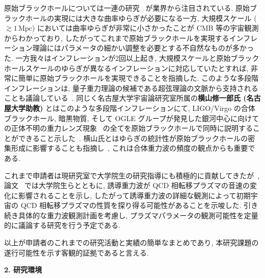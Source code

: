 \documentclass[11pt,a4paper,uplatex,dvipdfmx]{ujarticle} 		%
\newcommand{\研究課題名}{曲率ゆらぎの統計と原始ブラックホール量の精密対応}
\newcommand{\研究機関名}{名古屋大学}
\newcommand{\研究代表者氏名}{多田祐一郎}
\newcommand{\研究期間の最終元号年度}{4}  %
\renewcommand{\emph}[1]{{\sffamily\gtfamily\bfseries #1}}
\begin{document}
原始ブラックホールについては一連の研究~\cite{Kawasaki:2016pql,Inomata:2016rbd,Inomata:2017okj,Inomata:2017uaw} が業界から注目されている.
原始ブラックホールの実現には大きな曲率ゆらぎが必要になる一方, 大規模スケール ($\gtrsim1\,\mathrm{Mpc}$) においては曲率ゆらぎが非常に小さかったことが CMB 等の宇宙観測からわかっており,
したがってこれまで原始ブラックホールを実現するインフレーション理論にはパラメータの細かい調整を必要とする不自然なものが多かった.
一方我々はインフレーションが2回以上起き, 大規模スケールと原始ブラックホールスケールのゆらぎが異なるインフレーションに対応していたとすれば, 非常に簡単に原始ブラックホールを実現できることを指摘した.
このような多段階インフレーションは, 量子重力理論の候補である超弦理論の文脈から支持されることも議論している~\cite{Kogai:2020jkq}.
同じく名古屋大学宇宙論研究室所属の\emph{横山修一郎氏 (名古屋大学助教)} とはこのような多段階インフレーションにて, LIGO/Virgo の合体ブラックホール, 暗黒物質, そして OGLE グループが発見した銀河中心に向けての正体不明の重力レンズ現象~\cite{Niikura:2019kqi}
の全てを原始ブラックホールで同時に説明することができること示した~\cite{Tada:2019amh}.
横山氏とはゆらぎの統計性が原始ブラックホールの密集形成に影響することも指摘し~\cite{Tada:2015noa}, これは合体重力波の頻度の観点からも重要である.

これまで申請者は現研究室で大学院生の研究指導にも積極的に貢献してきたが~\cite{Kogai:2020jkq,Mikura:2020qhc,Abe:2020sqb},
論文~\cite{Abe:2020sqb} では大学院生らとともに, 誘導重力波が QCD 相転移プラズマの音速の変化に影響されることを示し, 
したがって誘導重力波の詳細な観測によって初期宇宙の QCD 相転移プラズマの性質を探り得る可能性があることを示唆した.
引き続き具体的な重力波観測計画を考慮し, プラズマパラメータの観測可能性を定量的に議論する研究を行う予定である.

以上が申請者のこれまでの研究活動と実績の簡単なまとめであり, 本研究課題の遂行可能性を示す客観的証拠であると言える.


\begin{mdframed}[roundcorner=0.5zw,
	innertopmargin=0.8zw,innerbottommargin=0.8zw,
	linecolor=black!50,linewidth=0.2zw,
	backgroundcolor=black!10]
	{\bfseries\gtfamily\sffamily\large 2. 研究環境}
\end{mdframed}
\end{document}
